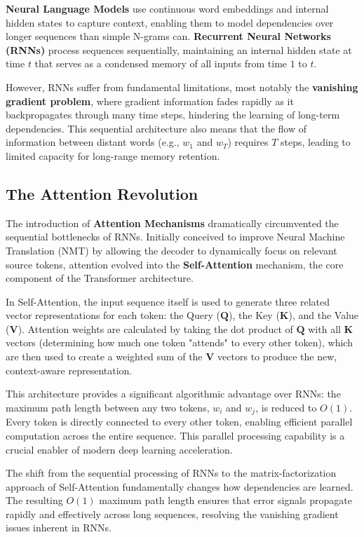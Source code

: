 \documentclass{article}
\begin{document}
\textbf{Neural Language Models} use continuous word embeddings and internal hidden states to capture context, enabling them to model dependencies over longer sequences than simple N-grams can. \textbf{Recurrent Neural Networks (RNNs)} process sequences sequentially, maintaining an internal hidden state at time $t$ that serves as a condensed memory of all inputs from time $1$ to $t$.

However, RNNs suffer from fundamental limitations, most notably the \textbf{vanishing gradient problem}, where gradient information fades rapidly as it backpropagates through many time steps, hindering the learning of long-term dependencies. This sequential architecture also means that the flow of information between distant words (e.g., $w_1$ and $w_T$) requires $T$ steps, leading to limited capacity for long-range memory retention.

\subsection{The Attention Revolution}

The introduction of \textbf{Attention Mechanisms} dramatically circumvented the sequential bottlenecks of RNNs. Initially conceived to improve Neural Machine Translation (NMT) by allowing the decoder to dynamically focus on relevant source tokens, attention evolved into the \textbf{Self-Attention} mechanism, the core component of the Transformer architecture.

In Self-Attention, the input sequence itself is used to generate three related vector representations for each token: the Query ($\mathbf{Q}$), the Key ($\mathbf{K}$), and the Value ($\mathbf{V}$). Attention weights are calculated by taking the dot product of $\mathbf{Q}$ with all $\mathbf{K}$ vectors (determining how much one token "attends" to every other token), which are then used to create a weighted sum of the $\mathbf{V}$ vectors to produce the new, context-aware representation.

This architecture provides a significant algorithmic advantage over RNNs: the maximum path length between any two tokens, $w_i$ and $w_j$, is reduced to $O(1)$. Every token is directly connected to every other token, enabling efficient parallel computation across the entire sequence. This parallel processing capability is a crucial enabler of modern deep learning acceleration.

The shift from the sequential processing of RNNs to the matrix-factorization approach of Self-Attention fundamentally changes how dependencies are learned. The resulting $O(1)$ maximum path length ensures that error signals propagate rapidly and effectively across long sequences, resolving the vanishing gradient issues inherent in RNNs.
\end{document}
